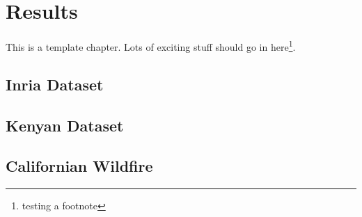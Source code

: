 \chapter{Results}
This is a template chapter. Lots of exciting stuff should go in here\footnote{testing a footnote}.
\section{Inria Dataset}

\section{Kenyan Dataset}

\section{Californian Wildfire}



